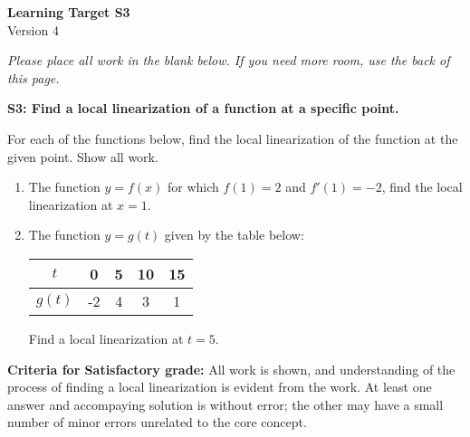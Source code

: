 \documentclass[10pt]{article}
\begin{document}
	\vspace*{0in}

		\begin{center}
			\textbf{Learning Target S3} \\
			{Version 4} \\
		\end{center}

\emph{Please place all work in the blank below. If you need more room, use the back of this page.}

\begin{framed}
	\textbf{S3: Find a local linearization of a function at a specific point.}
\end{framed}

For each of the functions below, find the local linearization of the function at the given point. Show all work. 

\begin{enumerate}
    \item The function $y = f(x)$ for which $f(1) = 2$ and $f'(1) = -2$, find the local linearization at $x=1$.
    
    \item The function $y = g(t)$ given by the table below: 
    \begin{center}
            \begin{tabular}{c||c|c|c|c|}
        $t$ &  0 & 5 & 10 & 15  \\ \hline 
        $g(t)$ & -2 & 4 & 3 & 1 
    \end{tabular}
    \end{center}
    Find a local linearization at $t = 5$. 

    
    
\end{enumerate}



\vfill


\begin{small}
    \begin{framed}
        	\textbf{Criteria for Satisfactory grade:} All work is shown, and understanding of the process of finding a local linearization is evident from the work. At least one answer and accompaying solution is without error; the other may have a small number of minor errors unrelated to the core concept. 
    \end{framed}

\end{small}
\end{document}
